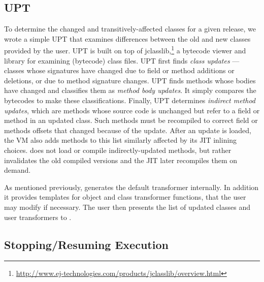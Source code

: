 \subsection{\acf{UPT}}
\label{sec:prep}

To determine the changed and transitively-affected classes for a given
release, we wrote a simple \acf{UPT} that examines differences between
the old and new classes provided by the user.  \ac{UPT} is built on
top of
jclasslib,\footnote{\url{http://www.ej-technologies.com/products/jclasslib/overview.html}}
a bytecode viewer and library for examining (bytecode) class files.
\ac{UPT} first finds \emph{class updates} --- classes whose signatures
have changed due to field or method additions or deletions, or due to
method signature changes.  \ac{UPT} finds methods whose bodies have changed
and classifies them as \emph{method body updates}.  It simply compares
the bytecodes to make these classifications.
%
Finally, \ac{UPT} determines \emph{indirect method updates}, which are
methods whose source code is unchanged but refer to a field or method
in an updated class.  Such methods must be recompiled to correct field
or methods offsets that changed because of the update.  After an
update is loaded,
the VM also adds methods to this list similarly affected by its \acs{JIT} inlining choices.
\DSU{} does not load or compile indirectly-updated methods, but
rather invalidates the old compiled versions and the \acs{JIT} later
recompiles them on demand.

As mentioned previously, \DSU{} generates the default transformer
internally.  In addition it provides
templates for object and class 
transformer functions, that the user may modify if necessary.
The user then presents the list of updated classes and user
transformers to \DSU{}.



\subsection{Stopping/Resuming Execution}
\label{sec:safe}

